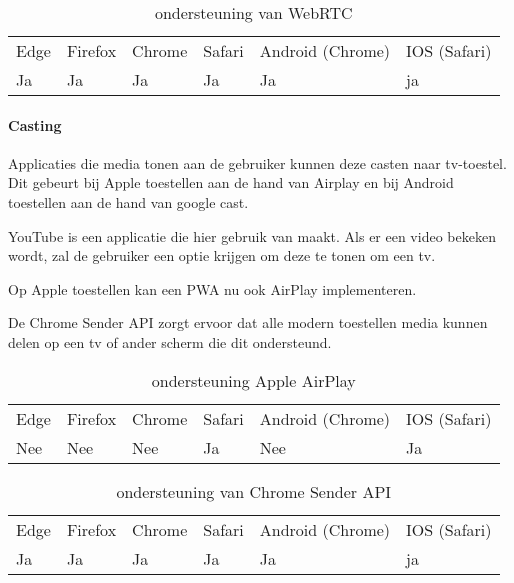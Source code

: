 \begin{table}[]
	\begin{tabular}{llllll}
		Edge & Firefox & Chrome & Safari & Android (Chrome) & IOS (Safari) \\
		Ja   & Ja      & Ja     & Ja     & Ja               & ja          
	\end{tabular}	
	\caption{ondersteuning van WebRTC}
	\label{ondersteuning van WebRTC}
\end{table}




\paragraph{Casting}


Applicaties die media tonen aan de gebruiker kunnen deze casten naar tv-toestel. Dit gebeurt bij Apple toestellen aan de hand van Airplay en bij Android toestellen aan de hand van google cast.


YouTube is een applicatie die hier gebruik van maakt. Als er een video bekeken wordt, zal de gebruiker een optie krijgen om deze te tonen om een tv.


Op Apple toestellen kan een PWA nu ook AirPlay implementeren. 

\autocite{Apple2020a}


De Chrome Sender API \autocite{Developers2020b} zorgt ervoor dat alle modern toestellen media kunnen delen op een tv of ander scherm die dit ondersteund.

\begin{table}[]
	\begin{tabular}{llllll}
		Edge & Firefox & Chrome & Safari & Android (Chrome) & IOS (Safari) \\
		Nee   & Nee      & Nee     & Ja     & Nee               & Ja          
	\end{tabular}	
	\caption{ondersteuning Apple AirPlay}
	\label{ondersteuning Apple AirPlay}
\end{table}
\begin{table}[]
	\begin{tabular}{llllll}
		Edge & Firefox & Chrome & Safari & Android (Chrome) & IOS (Safari) \\
		Ja   & Ja      & Ja     & Ja     & Ja               & ja          
	\end{tabular}	
	\caption{ondersteuning van Chrome Sender API}
	\label{ndersteuning van Chrome Sender API}
\end{table}




